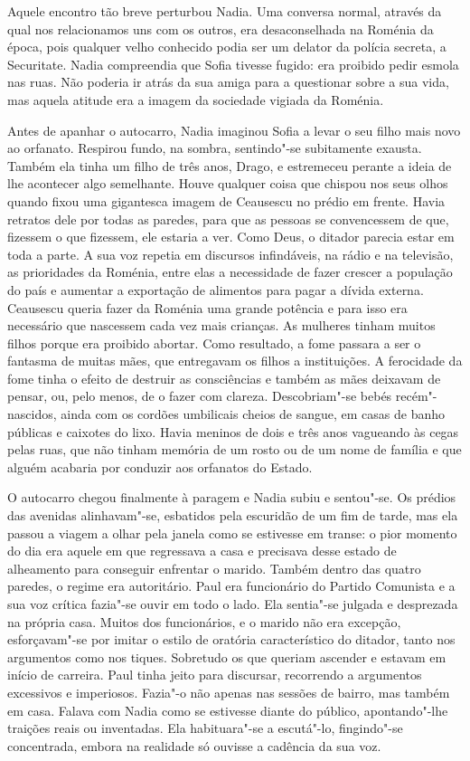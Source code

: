 Aquele encontro tão breve perturbou Nadia. Uma conversa normal,
através da qual nos relacionamos uns com os outros, era desaconselhada
na Roménia da época, pois qualquer velho conhecido podia ser um delator
da polícia secreta, a Securitate. Nadia compreendia que Sofia tivesse
fugido: era proibido pedir esmola nas ruas. Não poderia ir atrás da sua
amiga para a questionar sobre a sua vida, mas aquela atitude era a
imagem da sociedade vigiada da Roménia.

Antes de apanhar o autocarro, Nadia imaginou Sofia a levar o seu filho
mais novo ao orfanato. Respirou fundo, na sombra, sentindo"-se
subitamente exausta. Também ela tinha um filho de três anos, Drago, e
estremeceu perante a ideia de lhe acontecer algo semelhante. Houve
qualquer coisa que chispou nos seus olhos quando fixou uma gigantesca
imagem de Ceausescu no prédio em frente. Havia retratos dele por todas
as paredes, para que as pessoas se convencessem de que, fizessem o que
fizessem, ele estaria
a ver. Como Deus, o ditador parecia estar em toda a parte. A sua voz
repetia em discursos infindáveis, na rádio e na televisão, as
prioridades da Roménia, entre elas a necessidade de fazer crescer a
população do país e aumentar a exportação de alimentos para pagar a
dívida externa. Ceausescu queria fazer da Roménia uma grande potência e
para isso era necessário que nascessem cada vez mais crianças. As
mulheres tinham muitos filhos porque era proibido abortar. Como
resultado, a fome passara a ser o fantasma de muitas mães, que
entregavam os filhos a instituições. A ferocidade da fome tinha o
efeito de destruir as consciências e também as mães deixavam de pensar,
ou, pelo menos, de o fazer com clareza. Descobriam"-se bebés
recém"-nascidos, ainda com os cordões umbilicais cheios de sangue, em
casas de banho públicas e caixotes do lixo. Havia meninos de dois e três
anos vagueando às cegas pelas ruas, que não tinham memória de um rosto
ou de um nome de família e que alguém acabaria por conduzir aos
orfanatos do Estado.

O autocarro chegou finalmente à paragem e Nadia
subiu e sentou"-se. Os prédios das avenidas alinhavam"-se, esbatidos pela
escuridão de um fim de tarde, mas ela passou a viagem a olhar pela
janela como se estivesse em transe: o pior momento do dia era aquele em
que regressava a casa e precisava desse estado de alheamento para
conseguir enfrentar o marido. Também dentro das quatro paredes, o regime
era autoritário. Paul era funcionário do Partido Comunista e a sua voz
crítica fazia"-se ouvir em todo o lado. Ela sentia"-se julgada e
desprezada na própria casa. Muitos dos funcionários, e o marido não era
excepção,
esforçavam"-se por imitar o estilo de oratória característico do ditador,
tanto nos argumentos como nos tiques. Sobretudo os que queriam
ascender e estavam em início de carreira. Paul tinha jeito para
discursar, recorrendo a argumentos excessivos e imperiosos. Fazia"-o não
apenas nas sessões de bairro, mas também em casa. Falava com Nadia como
se estivesse diante do público, apontando"-lhe traições reais ou
inventadas. Ela habituara"-se a escutá"-lo, fingindo"-se concentrada,
embora na realidade só ouvisse a cadência da sua voz.

